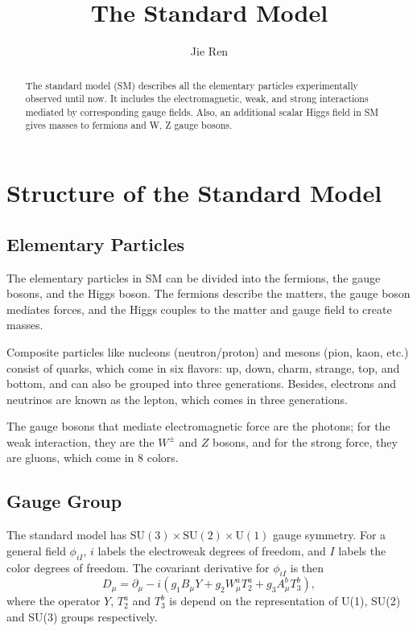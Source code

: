 \documentclass[aps,rmp,twocolumn,superscriptaddress,nofootinbib]{revtex4-2}
\begin{document}
\title{The Standard Model}
\author{Jie Ren}

\begin{abstract}
The standard model (SM) describes all the elementary particles experimentally observed until now.
It includes the electromagnetic, weak, and strong interactions mediated by corresponding gauge fields.
Also, an additional scalar Higgs field in SM gives masses to fermions and W, Z gauge bosons.
\end{abstract}

\maketitle



\tableofcontents


\section{Structure of the Standard Model}




\subsection{Elementary Particles}

The elementary particles in SM can be divided into the fermions, the gauge bosons, and the Higgs boson. 
The fermions describe the matters, the gauge boson mediates forces, and the Higgs couples to the matter and gauge field to create masses.

Composite particles like nucleons (neutron/proton) and mesons (pion, kaon, etc.) consist of quarks, which come in six flavors: up, down, charm, strange, top, and bottom, and can also be grouped into three generations.
Besides, electrons and neutrinos are known as the lepton, which comes in three generations.

The gauge bosons that mediate electromagnetic force are the photons; for the weak interaction, they are the $W^\pm$ and $Z$ bosons, and for the strong force, they are gluons, which come in 8 colors.





\subsection{Gauge Group}

The standard model has $\mathrm{SU(3)}\times\mathrm{SU(2)}\times\mathrm{U(1)}$ gauge symmetry.
For a general field $\phi_{iI}$, $i$ labels the electroweak degrees of freedom, and $I$ labels the color degrees of freedom.
The covariant derivative for $\phi_{iI}$ is then
$$D_\mu = \partial_\mu -i \left(g_1 B_\mu Y + g_2 W^a_\mu T^a_{2} + g_3 A_\mu^b T^b_3                                                  \right),$$
where the operator $Y$, $T_2^a$ and $T_3^b$ is depend on the representation of U(1), SU(2) and SU(3) groups respectively. 
\end{document}
